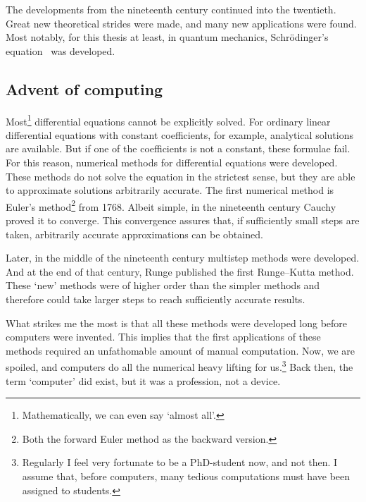The developments from the nineteenth century continued into the twentieth. Great new theoretical strides were made, and many new applications were found. Most notably, for this thesis at least, in quantum mechanics, Schrödinger's equation~\cite{schroedinger_quantisierung_1926} was developed.

\subsection{Advent of computing}

Most\footnote{Mathematically, we can even say `almost all'.} differential equations cannot be explicitly solved. For ordinary linear differential equations with constant coefficients, for example, analytical solutions are available. But if one of the coefficients is not a constant, these formulae fail. For this reason, numerical methods for differential equations were developed. These methods do not solve the equation in the strictest sense, but they are able to approximate solutions arbitrarily accurate. The first numerical method is Euler's method\footnote{Both the forward Euler method as the backward version.} from 1768. Albeit simple, in the nineteenth century Cauchy proved it to converge. This convergence assures that, if sufficiently small steps are taken, arbitrarily accurate approximations can be obtained.

Later, in the middle of the nineteenth century multistep methods were developed. And at the end of that century, Runge published the first Runge--Kutta method. These `new' methods were of higher order than the simpler methods and therefore could take larger steps to reach sufficiently accurate results.

What strikes me the most is that all these methods were developed long before computers were invented. This implies that the first applications of these methods required an unfathomable amount of manual computation. Now, we are spoiled, and computers do all the numerical heavy lifting for us.\footnote{Regularly I feel very fortunate to be a PhD-student now, and not then. I assume that, before computers, many tedious computations must have been assigned to students.} Back then, the term `computer' did exist, but it was a profession, not a device.

